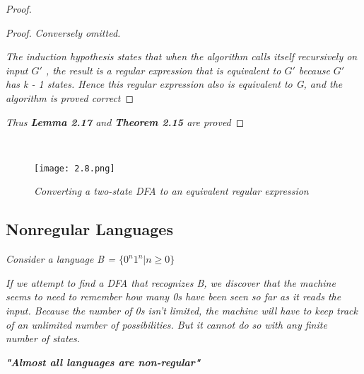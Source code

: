 \documentclass{article}
\begin{document}
\begin{proof}
\begin{claim}
\begin{proof}
        \textit{Conversely omitted.}

        \textit{The induction hypothesis states that when the algorithm calls itself recursively on input $G'$
        , the result is a regular expression that is equivalent to $G'$
        because $G'$ has k - 1 states. Hence this regular expression also is equivalent to
        G, and the algorithm is proved correct}
    \end{proof}
\end{claim}
    \textit{Thus \textbf{Lemma 2.17} and \textbf{Theorem 2.15} are proved}
\end{proof}

\begin{example}
    \
    \begin{figure}[H]
        \begin{center}
            \texttt{[image: 2.8.png]}
        \end{center}
        \caption{\textit{Converting a two-state DFA to an equivalent regular expression}}
    \end{figure}
\end{example}

\subsection{Nonregular Languages}

\begin{example}
    \textit{Consider a language B = $\{0^n1^n|n\geq0\}$}

    \textit{If we attempt to find a DFA
    that recognizes B, we discover that the machine seems to need to remember
    how many 0s have been seen so far as it reads the input. Because the number of
    0s isn't limited, the machine will have to keep track of an unlimited number of
    possibilities. But it cannot do so with any finite number of states.}

\end{example}

\textit{\textbf{"Almost all languages are non-regular"}}
\end{document}
